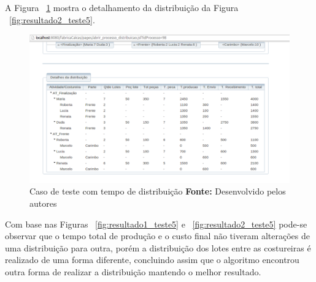 \par A Figura ~\ref{fig:detalhamento2_teste5} mostra o detalhamento da
distribuição da Figura ~\ref{fig:resultado2_teste5}.



\begin{figure}[h!]
	\centerline{\includegraphics[scale=0.3]{./imagens/detalhamento2_teste5.png}}
	\caption[Caso de teste com tempo de distribuição]
	{Caso de teste com tempo de distribuição \textbf{Fonte:} Desenvolvido pelos autores}
	\label{fig:detalhamento2_teste5}
\end{figure}


\par Com base nas Figuras ~\ref{fig:resultado1_teste5} e
~\ref{fig:resultado2_teste5} pode-se observar que o tempo total de produção e o
custo final não tiveram alterações de uma distribuição para outra, porém a
distribuição dos lotes entre as costureiras é realizado de uma forma
diferente, concluindo assim que o algoritmo encontrou outra forma de realizar a
distribuição mantendo o melhor resultado.
